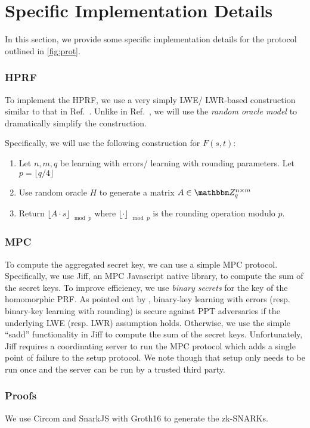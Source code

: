 \section{Specific Implementation Details}
In this section, we provide some specific implementation details for the protocol outlined in \cref{fig:prot}.

\subsubsection*{HPRF}
To implement the HPRF, we use a very simply LWE/ LWR-based construction similar to that in Ref.~\cite{boneh2013key}.
Unlike in Ref.~\cite{boneh2013key}, we will use the \emph{random oracle model} to dramatically simplify the construction.

Specifically, we will use the following construction for $F(s, t)$:
\begin{enumerate}
	\item Let $n, m, q$ be learning with errors/ learning with rounding parameters.
		Let $p = \lfloor q / 4 \rfloor$
	\item Use random oracle $H$ to generate a matrix $A \in \Z_q^{n \times m}$
	\item Return $\lfloor A \cdot s \rfloor_{\mod p}$ where $\lfloor \cdot \rfloor_{\mod p}$ is the rounding operation modulo $p$.
\end{enumerate}

\subsubsection*{MPC}
To compute the aggregated secret key, we can use a simple MPC protocol.
Specifically, we use Jiff, an MPC Javascript native library, to compute the sum of the secret keys.
To improve efficiency, we use \emph{binary secrets} for the key of the homomorphic PRF.
As pointed out by , binary-key learning with errors (resp. binary-key learning with rounding) is secure against PPT adversaries if the underlying LWE (resp. LWR) assumption holds.
Otherwise, we use the simple ``sadd'' functionality in Jiff to compute the sum of the secret keys.
Unfortunately, Jiff requires a coordinating server to run the MPC protocol which adds a single point of failure to the setup protocol.
We note though that setup only needs to be run once and the server can be run by a trusted third party.

\subsubsection*{Proofs}
We use Circom and SnarkJS with Groth16 \cite{groth2016size} to generate the zk-SNARKs.

